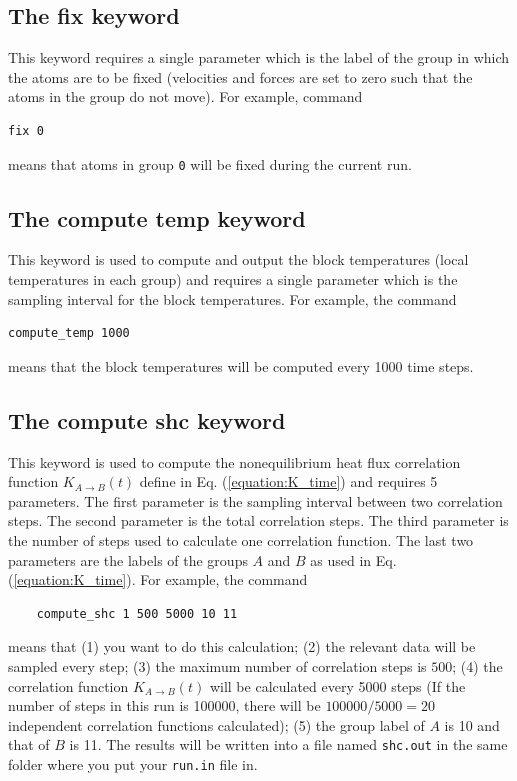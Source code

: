 \documentclass[12pt,a4paper]{report}
\begin{document}
\subsection{The fix keyword}

This keyword requires a single parameter which is the label of the group in which the atoms are to be fixed (velocities and forces are set to zero such that the atoms in the group do not move). For example, command
\begin{verbatim}
fix 0
\end{verbatim}
means that atoms in group \verb"0" will be fixed during the current run.



\subsection{The compute temp keyword}

This keyword is used to compute and output the block temperatures (local temperatures in each group) and requires a single parameter which is the sampling interval for the block temperatures. For example, the command
\begin{verbatim}
compute_temp 1000
\end{verbatim}
means that the block temperatures will be computed every 1000 time steps.


\subsection{The compute shc keyword}

This keyword is used to compute the nonequilibrium heat flux correlation function $K_{A \rightarrow B}(t)$ define in Eq. (\ref{equation:K_time}) and requires 5 parameters. The first parameter is the sampling interval between two correlation steps. The second parameter is the total correlation steps. The third parameter is the number of steps used to calculate one correlation function. The last two parameters are the labels of the groups $A$ and $B$ as used in Eq. (\ref{equation:K_time}). For example, the command
\begin{verbatim}
    compute_shc 1 500 5000 10 11
\end{verbatim}
means that (1) you want to do this calculation; (2) the relevant data will be sampled every step; (3) the maximum number of correlation steps is $500$; (4) the correlation function $K_{A \rightarrow B}(t)$ will be calculated every 5000 steps (If the number of steps in this run is 100000, there will be $100000/5000=20$ independent correlation functions calculated); (5) the group label of $A$ is 10 and that of $B$ is 11. The results will be written into a file named \verb"shc.out" in the same folder where you put your \verb"run.in" file in.
\end{document}
